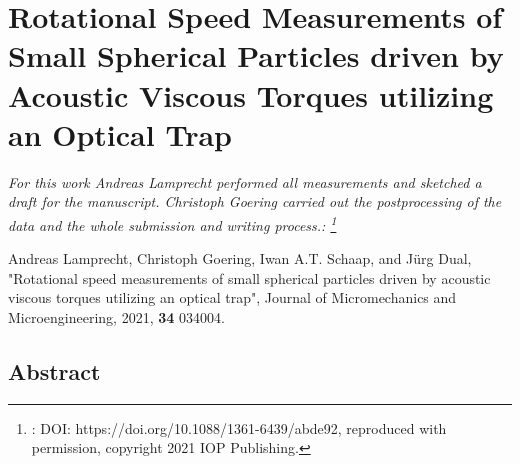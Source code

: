 \renewcommand{\relPath}{SECTION/50_Viscous_Torque}
 
\chapter[Particle Rotation Measurements with an OT]{Rotational Speed 
Measurements of Small Spherical Particles driven by Acoustic Viscous Torques 
utilizing an Optical Trap}\label{ch:viscoustorque}
\textit{For this work Andreas Lamprecht performed all measurements and sketched 
  a draft for the manuscript. Christoph Goering carried out the postprocessing 
  of the data and the whole submission and writing process.:
\footnote{: DOI: https://doi.org/10.1088/1361-6439/abde92, reproduced with 
permission, copyright 2021 IOP Publishing.}}

\vspace{5mm} \noindent
Andreas Lamprecht, Christoph Goering, Iwan A.T. Schaap, and Jürg Dual,
"Rotational speed measurements of small spherical particles driven by acoustic 
viscous torques utilizing an optical trap", Journal of Micromechanics and 
Microengineering, 2021, \textbf{34} 034004.


\section{Abstract}






